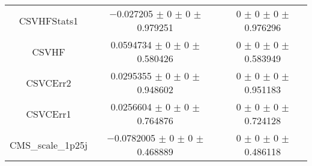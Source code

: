 \begin{table}
\begin{tabular}{ccc}
CSVHFStats1 & \num{-0.027205} $\pm$ \num{0} $\pm$ \num{0} $\pm$ \num{0.979251} & \num{0} $\pm$ \num{0} $\pm$ \num{0} $\pm$ \num{0.976296}\\
CSVHF & \num{0.0594734} $\pm$ \num{0} $\pm$ \num{0} $\pm$ \num{0.580426} & \num{0} $\pm$ \num{0} $\pm$ \num{0} $\pm$ \num{0.583949}\\
CSVCErr2 & \num{0.0295355} $\pm$ \num{0} $\pm$ \num{0} $\pm$ \num{0.948602} & \num{0} $\pm$ \num{0} $\pm$ \num{0} $\pm$ \num{0.951183}\\
CSVCErr1 & \num{0.0256604} $\pm$ \num{0} $\pm$ \num{0} $\pm$ \num{0.764876} & \num{0} $\pm$ \num{0} $\pm$ \num{0} $\pm$ \num{0.724128}\\
CMS\_scale\_1p25j & \num{-0.0782005} $\pm$ \num{0} $\pm$ \num{0} $\pm$ \num{0.468889} & \num{0} $\pm$ \num{0} $\pm$ \num{0} $\pm$ \num{0.486118}\\
\bottomrule
\end{tabular}
\end{table}